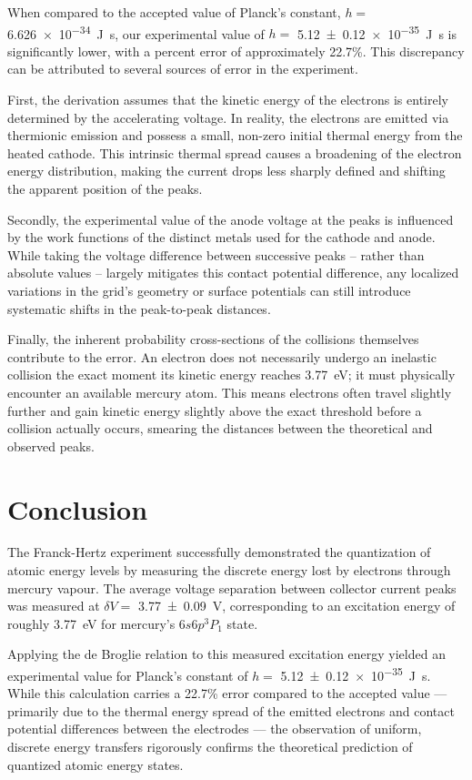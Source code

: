 \documentclass[11pt]{article}
\begin{document}
    When compared to the accepted value of Planck's constant,
    \( h = \) \SI{6.626e-34}{\joule\second}, our experimental value of
    \( h = \) \SI{5.12 \pm 0.12 e-35}{\joule\second} is significantly lower,
    with a percent error of approximately 22.7\%.
    This discrepancy can be attributed to several sources of error in the
    experiment.

    First, the derivation assumes that the kinetic energy of the electrons is
    entirely determined by the accelerating voltage.
    In reality, the electrons are emitted via thermionic emission and possess
    a small, non-zero initial thermal energy from the heated cathode.
    This intrinsic thermal spread causes a broadening of the electron energy
    distribution, making the current drops less sharply defined and shifting
    the apparent position of the peaks.

    Secondly, the experimental value of the anode voltage at the peaks is
    influenced by the work functions of the distinct metals used for the
    cathode and anode.
    While taking the voltage difference between successive peaks -- rather
    than absolute values -- largely mitigates this contact potential
    difference, any localized variations in the grid's geometry or
    surface potentials can still introduce systematic shifts in the
    peak-to-peak distances.

    Finally, the inherent probability cross-sections of the collisions
    themselves contribute to the error.
    An electron does not necessarily undergo an inelastic collision the exact
    moment its kinetic energy reaches \SI{3.77}{\electronvolt}; it must
    physically encounter an available mercury atom.
    This means electrons often travel slightly further and gain kinetic energy
    slightly above the exact threshold before a collision actually occurs,
    smearing the distances between the theoretical and observed peaks.

    \section{Conclusion}\label{sec:conclusion}

    The Franck-Hertz experiment successfully demonstrated the quantization of
    atomic energy levels by measuring the discrete energy lost by electrons
    through mercury vapour.
    The average voltage separation between collector current peaks was
    measured at \( \delta V = \) \SI{3.77 \pm 0.09}{\volt}, corresponding to
    an excitation energy of roughly \SI{3.77}{\electronvolt} for mercury's
    \( 6s6p^3 P_1 \) state.

    Applying the de Broglie relation to this measured excitation energy
    yielded an experimental value for Planck's constant of \( h = \)
    \SI{5.12 \pm 0.12 e-35}{\joule\second}.
    While this calculation carries a 22.7\% error compared to the accepted
    value --- primarily due to the thermal energy spread of the emitted
    electrons and contact potential differences between the electrodes --- the
    observation of uniform, discrete energy transfers rigorously confirms the
    theoretical prediction of quantized atomic energy states.
\end{document}
